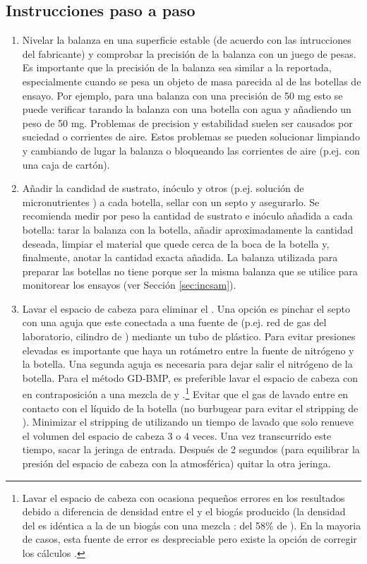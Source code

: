 \documentclass[]{article}
\begin{document}
\subsection{Instrucciones paso a paso}
\begin{enumerate}
  \item Nivelar la balanza en una superficie estable (de acuerdo con las intrucciones del fabricante) y comprobar la precisión de la balanza con un juego de pesas.
      Es importante que la precisión de la balanza sea similar a la reportada, especialmente cuando se pesa un objeto de masa parecida al de las botellas de ensayo. Por ejemplo, para una balanza con una precisión de 50 mg esto se puede verificar tarando la balanza con una botella con agua y añadiendo un peso de 50 mg. Problemas de precision y estabilidad suelen ser causados por suciedad o corrientes de aire. Estos problemas se pueden solucionar limpiando y cambiando de lugar la balanza o bloqueando las corrientes de aire (p.ej. con una caja de cartón).
    \item Añadir la candidad de sustrato, inóculo y otros (p.ej. solución de micronutrientes \citep{holligerStandardizationBiomethanePotential2016}) a cada botella, sellar con un septo y asegurarlo. Se recomienda medir por peso la cantidad de sustrato e inóculo añadida a cada botella: tarar la balanza con la botella, añadir aproximadamente la cantidad deseada, limpiar el material que quede cerca de la boca de la botella y, finalmente, anotar la cantidad exacta añadida. La balanza utilizada para preparar las botellas no tiene porque ser la misma balanza que se utilice para monitorear los ensayos (ver Sección \ref{sec:incsam}).
    \item Lavar el espacio de cabeza para eliminar el . 
    Una opción es pinchar el septo con una aguja que este conectada a una fuente de  (p.ej. red de gas
    del laboratorio, cilindro de ) mediante un tubo de plástico. Para evitar presiones elevadas es importante que haya un rotámetro entre la fuente de nitrógeno y la botella. Una segunda aguja es necesaria para dejar salir el nitrógeno de la botella. Para el método GD-BMP, es preferible lavar el espacio de cabeza con  en contraposición a una mezcla de  y .\footnote{Lavar el espacio de cabeza con  ocasiona pequeños errores en los resultados debido a diferencia de densidad entre el  y el biogás producido (la densidad del  es idéntica a la de un biogás con una mezcla : del 58\% de ). En la mayoria de casos, esta fuente de error es despreciable pero existe la opción de corregir los cálculos \citep{justesenDevelopmentValidationLowcost2019}.
} 
      Evitar que el gas de lavado entre en contacto con el líquido de la botella (no burbugear para evitar el stripping de ).
      Minimizar el stripping de  utilizando un tiempo de lavado que solo renueve el volumen del espacio de cabeza 3 o 4 veces.
      Una vez transcurrido este tiempo, sacar la jeringa de entrada. Después de 2 segundos (para equilibrar la presión del espacio de cabeza con la atmosférica) quitar la otra jeringa.
      

\end{enumerate}
\end{document}

